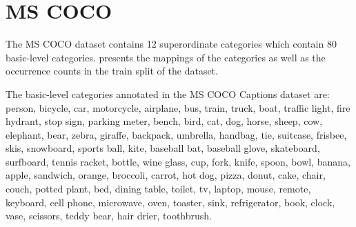 \section{MS COCO}
The MS COCO dataset \parencite{chen2015microsoft} contains 12 superordinate categories which contain 80 basic-level categories.  presents the mappings of the categories as well as the occurrence counts in the train split of the dataset. 

The basic-level categories annotated in the MS COCO Captions dataset are: person, bicycle, car, motorcycle, airplane, bus, train, truck, boat, traffic light, fire hydrant, stop sign, parking meter, bench, bird, cat, dog, horse, sheep, cow, elephant, bear, zebra, giraffe, backpack, umbrella, handbag, tie, suitcase, frisbee, skis, snowboard, sports ball, kite, baseball bat, baseball glove, skateboard, surfboard, tennis racket, bottle, wine glass, cup, fork, knife, spoon, bowl, banana, apple, sandwich, orange, broccoli, carrot, hot dog, pizza, donut, cake, chair, couch, potted plant, bed, dining table, toilet, tv, laptop, mouse, remote, keyboard, cell phone, microwave, oven, toaster, sink, refrigerator, book, clock, vase, scissors, teddy bear, hair drier, toothbrush.

